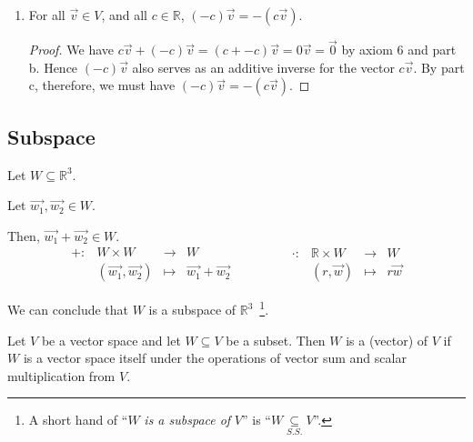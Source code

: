 \documentclass[11pt,fleqn]{book} %
\begin{document}
\begin{proposition}
\begin{enumerate}[label=\alph*)]
        \item For all $\overrightarrow{v} \in V$, and all $c \in \mathbb{R}$, $(-c)\overrightarrow{v}  = -(c\overrightarrow{v})$.
        \begin{proof}
            We have $c\overrightarrow{v} + (-c)\overrightarrow{v} = (c + -c)\overrightarrow{v} = 0\overrightarrow{v} = \overrightarrow{0}$ by axiom 6 and part b. Hence $(-c)\overrightarrow{v}$ also serves as an additive inverse for the vector $c\overrightarrow{v}$. By part c, therefore, we must have $(-c)\overrightarrow{v} = -(c\overrightarrow{v})$.
        \end{proof}
    \end{enumerate}
\end{proposition}
\setcounter{section}{3}

\subsection{Subspace}
\begin{example}
    Let $W \subseteq \mathbb{R}^3$. 
    
    Let $\overrightarrow{w_1}, \overrightarrow{w_2} \in W$. 
    
    Then, $\overrightarrow{w_1} + \overrightarrow{w_2} \in W$. 
    $$
        \begin{matrix} +: &W\times W &\to &W \\ &(\overrightarrow{w_1}, \overrightarrow{w_2}) &\mapsto &\overrightarrow{w_1} + \overrightarrow{w_2} \end{matrix} 
        \qquad \qquad 
        \begin{matrix} \cdot: &\mathbb{R} \times W &\to &W \\ &(r, \overrightarrow{w}) &\mapsto &r\overrightarrow{w} \end{matrix}
    $$
    
    We can conclude that $W$ is a subspace of $\mathbb{R}^3$~\footnote{A short hand of ``$W$ \textit{is a subspace of} $V$'' is ``$W \underset{S.S.}{\subseteq} V$''. }. 
\end{example}

\setcounter{section}{2}
\setcounter{definitionT}{5}
\begin{definition}[Subspace]
    Let $V$ be a vector space and let $W \subseteq V$ be a  subset. Then $W$ is a (vector)  of $V$ if $W$ is a vector space itself under the operations of vector sum and scalar multiplication from $V$.
\end{definition}
\setcounter{section}{3}
\end{document}
